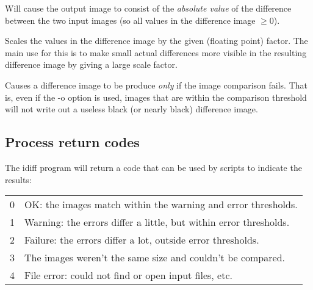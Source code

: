 Will cause the output image to consist of the \emph{absolute value}
of the difference between the two input images (so all values in the
difference image $\ge 0$).
\apiend

Scales the values in the difference image by the given (floating point)
factor.  The main use for this is to make small actual differences more
visible in the resulting difference image by giving a large scale factor.
\apiend

Causes a difference image to be produce \emph{only} if the image
comparison fails.  That is, even if the {\cf -o} option is used,
images that are within the comparison threshold will not write out
a useless black (or nearly black) difference image.
\apiend

\subsection*{Process return codes}

The {\cf idiff} program will return a code that can be used by scripts
to indicate the results:

\medskip

\begin{tabular}{p{0.3in} p{5in}}
0 & OK: the images match within the warning and error
thresholds. \\
1 & Warning: the errors differ a little, but within error thresholds. \\ 
2 & Failure: the errors differ a lot, outside error thresholds. \\
3 & The images weren't the same size and couldn't be compared. \\
4 & File error: could not find or open input files, etc.
\end{tabular}

\begin{code}
\end{code}
